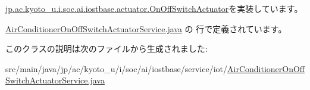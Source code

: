 \hyperlink{interfacejp_1_1ac_1_1kyoto__u_1_1i_1_1soc_1_1ai_1_1iostbase_1_1actuator_1_1_on_off_switch_actuator_ae8a7a45969693afae8233c7f07979078}{jp.\-ac.\-kyoto\-\_\-u.\-i.\-soc.\-ai.\-iostbase.\-actuator.\-On\-Off\-Switch\-Actuator}を実装しています。



 \hyperlink{_air_conditioner_on_off_switch_actuator_service_8java_source}{Air\-Conditioner\-On\-Off\-Switch\-Actuator\-Service.\-java} の  行で定義されています。



このクラスの説明は次のファイルから生成されました\-:\begin{DoxyCompactItemize}
\item 
src/main/java/jp/ac/kyoto\-\_\-u/i/soc/ai/iostbase/service/iot/\hyperlink{_air_conditioner_on_off_switch_actuator_service_8java}{Air\-Conditioner\-On\-Off\-Switch\-Actuator\-Service.\-java}\end{DoxyCompactItemize}
